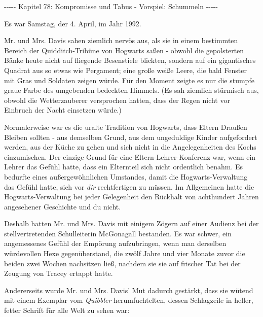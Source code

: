 

\hypertarget{kompromisse-und-tabus---vorspiel-schummeln}{%

-\/-\/-\/-\/- Kapitel 78: Kompromisse und Tabus - Vorspiel: Schummeln -\/-\/-\/-\/-

Es war Samstag, der 4. April, im Jahr 1992.

Mr. und Mrs. Davis sahen ziemlich nervös aus, als sie in einem bestimmten Bereich der Quidditch-Tribüne von Hogwarts saßen - obwohl die gepolsterten Bänke heute nicht auf fliegende Besenstiele blickten, sondern auf ein gigantisches Quadrat aus so etwas wie Pergament; eine große weiße Leere, die bald Fenster mit Gras und Soldaten zeigen würde. Für den Moment zeigte es nur die stumpfe graue Farbe des umgebenden bedeckten Himmels. (Es sah ziemlich stürmisch aus, obwohl die Wetterzauberer versprochen hatten, dass der Regen nicht vor Einbruch der Nacht einsetzen würde.)

Normalerweise war es die uralte Tradition von Hogwarts, dass Eltern Draußen Bleiben sollten - aus demselben Grund, aus dem ungeduldige Kinder aufgefordert werden, aus der Küche zu gehen und sich nicht in die Angelegenheiten des Kochs einzumischen. Der einzige Grund für eine Eltern-Lehrer-Konferenz war, wenn ein Lehrer das Gefühl hatte, dass ein Elternteil sich nicht ordentlich benahm. Es bedurfte eines außergewöhnlichen Umstandes, damit die Hogwarts-Verwaltung das Gefühl hatte, sich vor \emph{dir} rechtfertigen zu müssen. Im Allgemeinen hatte die Hogwarts-Verwaltung bei jeder Gelegenheit den Rückhalt von achthundert Jahren angesehener Geschichte und du nicht.

Deshalb hatten Mr. und Mrs. Davis mit einigem Zögern auf einer Audienz bei der stellvertretenden Schulleiterin McGonagall bestanden. Es war schwer, ein angemessenes Gefühl der Empörung aufzubringen, wenn man derselben würdevollen Hexe gegenüberstand, die zwölf Jahre und vier Monate zuvor die beiden zwei Wochen nachsitzen ließ, nachdem sie sie auf frischer Tat bei der Zeugung von Tracey ertappt hatte.

Andererseits wurde Mr. und Mrs. Davis' Mut dadurch gestärkt, dass sie wütend mit einem Exemplar vom \emph{Quibbler} herumfuchtelten, dessen Schlagzeile in heller, fetter Schrift für alle Welt zu sehen war:

}

